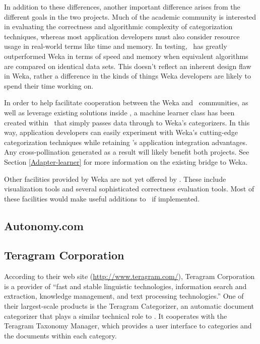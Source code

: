 In addition to these differences, another important difference arises
from the different goals in the two projects.  Much of the academic
community is interested in evaluating the correctness and algorithmic
complexity of categorization techniques, whereas most application
developers must also consider resource usage in real-world terms like
time and memory.  In testing, \aicat\ has greatly outperformed
Weka in terms of speed and memory when equivalent algorithms are
compared on identical data sets.  This doesn't reflect an inherent
design flaw in Weka, rather a difference in the kinds of things Weka
developers are likely to spend their time working on.

In order to help facilitate cooperation between the Weka and
\aicat\ communities, as well as leverage existing solutions
inside \aicat, a machine learner class has been created
within \aicat\ that simply passes data through to Weka's
categorizers.  In this way, application developers can easily
experiment with Weka's cutting-edge categorization techniques while
retaining \aicat's application integration advantages.  Any
cross-pollination generated as a result will likely benefit both
projects.  See Section \ref{Adapter-learner} for more information on
the existing bridge to Weka.

Other facilities provided by Weka are not yet offered by
\aicat.  These include visualization tools and several
sophisticated correctness evaluation tools.  Most of these
facilities would make useful additions to \aicat\ if
implemented.

\subsection{Autonomy.com}

\subsection{Teragram Corporation}

According to their web site (\url{http://www.teragram.com/}), Teragram
Corporation is a provider of ``fast and stable linguistic
technologies, information search and extraction, knowledge management,
and text processing technologies.''  One of their largest-scale
products is the Teragram Categorizer, an automatic document
categorizer that plays a similar technical role to \aicat.
It cooperates with the Teragram Taxonomy Manager, which provides a
user interface to categories and the documents within each category.


